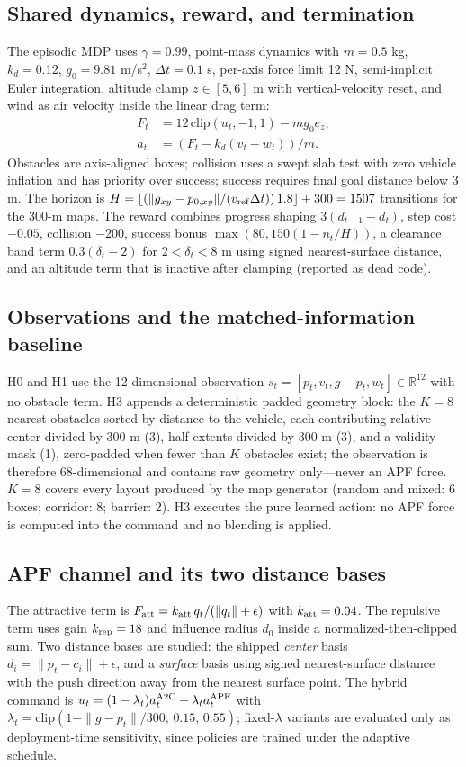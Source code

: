 \documentclass[conference]{IEEEtran}
\begin{document}
\subsection{Shared dynamics, reward, and termination}
The episodic MDP uses $\gamma=0.99$, point-mass dynamics with $m=0.5$ kg, $k_d=0.12$, $g_0=9.81$ m/s$^2$,
$\Delta t=0.1$ s, per-axis force limit 12 N, semi-implicit Euler integration, altitude clamp $z\in[5,6]$ m with
vertical-velocity reset, and wind as air velocity inside the linear drag term:
\begin{align}
F_t &= 12\,\mathrm{clip}(u_t,-1,1) - m g_0 e_z,\\
a_t &= (F_t - k_d (v_t - w_t))/m .
\end{align}
Obstacles are axis-aligned boxes; collision uses a swept slab test with zero vehicle inflation and has priority
over success; success requires final goal distance below 3 m. The horizon is
$H=\lfloor(\|g_{xy}-p_{0,xy}\|/(v_{\rm ref}\Delta t))\,1.8\rfloor+300=1507$ transitions for the 300-m maps.
The reward combines progress shaping $3(d_{t-1}-d_t)$, step cost $-0.05$, collision $-200$, success bonus
$\max(80,150(1-n_t/H))$, a clearance band term $0.3(\delta_t-2)$ for $2<\delta_t<8$ m using signed
nearest-surface distance, and an altitude term that is inactive after clamping (reported as dead code).
\subsection{Observations and the matched-information baseline}
H0 and H1 use the 12-dimensional observation $s_t=[p_t, v_t, g-p_t, w_t]\in\mathbb{R}^{12}$ with no obstacle term.
H3 appends a deterministic padded geometry block: the $K=8$ nearest obstacles sorted by distance to the vehicle,
each contributing relative center divided by 300 m (3), half-extents divided by 300 m (3), and a validity mask
(1), zero-padded when fewer than $K$ obstacles exist; the observation is therefore 68-dimensional and contains
raw geometry only---never an APF force. $K=8$ covers every layout produced by the map generator
(random and mixed: 6 boxes; corridor: 8; barrier: 2). H3 executes the pure learned action: no APF force is
computed into the command and no blending is applied.
\subsection{APF channel and its two distance bases}
The attractive term is $F_{\rm att}=k_{\rm att}\,q_t/(\|q_t\|+\epsilon)$ with $k_{\rm att}=0.04$. The repulsive
term uses gain $k_{\rm rep}=18$ and influence radius $d_0$ inside a normalized-then-clipped sum. Two distance
bases are studied: the shipped \emph{center} basis $d_i=\|p_t-c_i\|+\epsilon$, and a \emph{surface} basis using
signed nearest-surface distance with the push direction away from the nearest surface point. The hybrid command
is $u_t=(1-\lambda_t)a_t^{\rm A2C}+\lambda_t a_t^{\rm APF}$ with
$\lambda_t=\mathrm{clip}(1-\|g-p_t\|/300,\,0.15,\,0.55)$; fixed-$\lambda$ variants are evaluated only as
deployment-time sensitivity, since policies are trained under the adaptive schedule.
\end{document}
